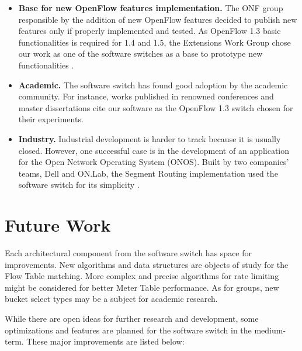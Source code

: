 \begin{itemize}
\item \textbf{Base for new OpenFlow features implementation.} The ONF group responsible by the addition of new OpenFlow features decided to publish new features only if properly implemented and tested. As OpenFlow 1.3 basic functionalities is required for 1.4 and 1.5, the Extensions Work Group chose our work as one of the software switches as a base to prototype new functionalities \cite{ONFproto}. 

\item \textbf{Academic.} The software switch has found good adoption by the academic community. For instance, works published in renowned conferences \cite{Reitblatt:2013:FDF:2491185.2491187} \cite{Bianchi:2014:OPP:2602204.2602211} and master dissertations \cite{Paris} \cite{ShahmirShourmasti656472} cite our software as the OpenFlow 1.3 switch chosen for their experiments.  

\item \textbf{Industry.} Industrial development is harder to track because it is usually closed. However, one successful case is in the development of an application for the Open Network Operating System (ONOS). Built by two companies' teams, Dell and ON.Lab, the Segment Routing implementation used the software switch for its simplicity \cite{ONOS}.         
\end{itemize}

\section{Future Work}

Each architectural component from the software switch has space for improvements. New algorithms and data structures are objects of study for the Flow Table matching. More complex and precise algorithms for rate limiting might be considered for better Meter Table performance. As for groups, new bucket select types may be a subject for academic research. 

While there are open ideas for further research and development, some optimizations and features are planned for the software switch in the medium-term. These major improvements are listed below:


